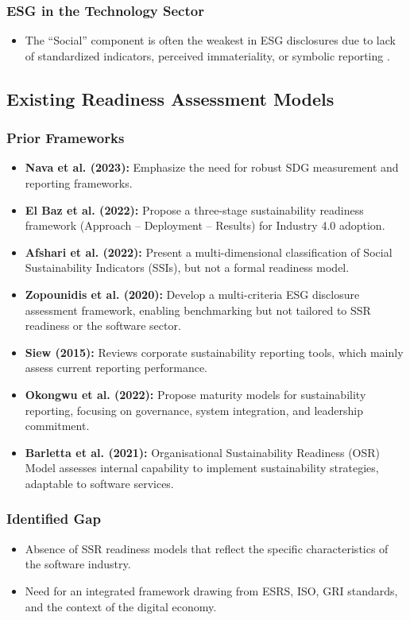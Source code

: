 \subsubsection{ESG in the Technology Sector}
\begin{itemize}
    \item The “Social” component is often the weakest in ESG disclosures due to lack of standardized indicators, perceived immateriality, or symbolic reporting \parencite{Christensen2021, Reitmaier2025}.
\end{itemize}

\subsection{Existing Readiness Assessment Models}
\subsubsection{Prior Frameworks}
\begin{itemize}
    \item \textbf{Nava et al. (2023):} Emphasize the need for robust SDG measurement and reporting frameworks.
    \item \textbf{El Baz et al. (2022):} Propose a three-stage sustainability readiness framework (Approach – Deployment – Results) for Industry 4.0 adoption.
    \item \textbf{Afshari et al. (2022):} Present a multi-dimensional classification of Social Sustainability Indicators (SSIs), but not a formal readiness model.
    \item \textbf{Zopounidis et al. (2020):} Develop a multi-criteria ESG disclosure assessment framework, enabling benchmarking but not tailored to SSR readiness or the software sector.
    \item \textbf{Siew (2015):} Reviews corporate sustainability reporting tools, which mainly assess current reporting performance.
    \item \textbf{Okongwu et al. (2022):} Propose maturity models for sustainability reporting, focusing on governance, system integration, and leadership commitment.
    \item \textbf{Barletta et al. (2021):} Organisational Sustainability Readiness (OSR) Model assesses internal capability to implement sustainability strategies, adaptable to software services.
\end{itemize}

\subsubsection{Identified Gap}
\begin{itemize}
    \item Absence of SSR readiness models that reflect the specific characteristics of the software industry.
    \item Need for an integrated framework drawing from ESRS, ISO, GRI standards, and the context of the digital economy.
\end{itemize}

